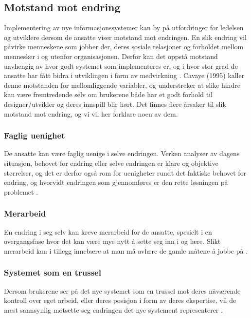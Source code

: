\subsection{Motstand mot endring}
\label{chp:motstand}

Implementering av nye informasjonssystemer kan by på utfordringer for ledelsen og utviklere dersom de ansatte viser motstand mot endringen. 
En slik endring vil påvirke menneskene som jobber der, deres sosiale relasjoner og forholdet mellom mennesker i og utenfor organisasjonen. Derfor kan det oppstå motstand uavhengig av hvor godt systemet som implementeres er, og i hvor stor grad de ansatte har fått bidra i utviklingen i form av medvirkning \cite{Jacobsen12}. Cavaye (1995) kaller denne motstanden for mellomliggende variabler, og understreker at slike hindre kan være fremtredende selv om brukerene både har et godt forhold til designer/utvikler og deres innspill blir hørt. Det finnes flere årsaker til slik motstand mot endring, og vi vil her forklare noen av dem. 

\subsubsection{Faglig uenighet}
De ansatte kan være faglig uenige i selve endringen. Verken analyser av dagens situasjon, behovet for endring eller selve endringen er klare og objektive størrelser, og det er derfor også rom for uenigheter rundt det faktiske behovet for endring, og hvorvidt endringen som gjennomføres er den rette løsningen på problemet \cite{Jacobsen12}.

\subsubsection{Merarbeid}
En endring i seg selv kan kreve merarbeid for de ansatte, spesielt i en overgangsfase hvor det kan være mye nytt å sette seg inn i og lære. Slikt merarbeid kan i tillegg innebære at man må avlære de gamle måtene å jobbe på \cite{Jacobsen12}.

\subsubsection{Systemet som en trussel}
Dersom brukerene ser på det nye systemet som en trussel mot deres nåværende kontroll over eget arbeid, eller deres posisjon i form av deres ekspertise, vil de mest sannsynlig motsette seg endringen det nye systement representerer \cite{Cavaye95}.

